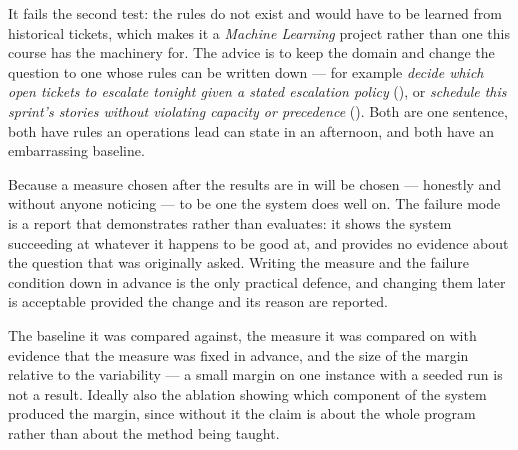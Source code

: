 \begin{ans}
  \item It fails the second test: the rules do not exist and would have to be learned
        from historical tickets, which makes it a \emph{Machine Learning} project
        rather than one this course has the machinery for. The advice is to keep the
        domain and change the question to one whose rules can be written down --- for
        example \emph{decide which open tickets to escalate tonight given a stated
        escalation policy} (), or \emph{schedule this sprint's stories
        without violating capacity or precedence} (). Both are one
        sentence, both have rules an operations lead can state in an afternoon, and
        both have an embarrassing baseline.
  \item Because a measure chosen after the results are in will be chosen --- honestly
        and without anyone noticing --- to be one the system does well on. The
        failure mode is a report that demonstrates rather than evaluates: it shows
        the system succeeding at whatever it happens to be good at, and provides no
        evidence about the question that was originally asked. Writing the measure
        and the failure condition down in advance is the only practical defence, and
        changing them later is acceptable provided the change and its reason are
        reported.
  \item The baseline it was compared against, the measure it was compared on with
        evidence that the measure was fixed in advance, and the size of the margin
        relative to the variability --- a small margin on one instance with a seeded
        run is not a result. Ideally also the ablation showing which component of
        the system produced the margin, since without it the claim is about the
        whole program rather than about the method being taught.
\end{ans}
